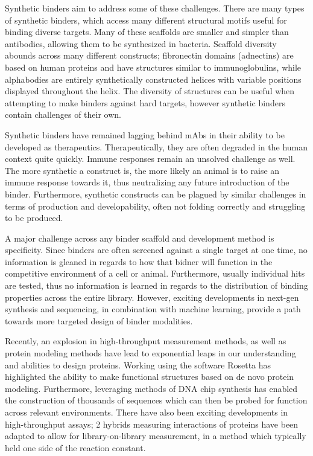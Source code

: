 Synthetic binders aim to address some of these challenges. There are many types of synthetic binders\cite{Yu2017-qj,Murali2012-tq,Krehenbrink2008-aj,Behar2013-ya,Desmet2014-ir,Richter2014-ll,Parmeggiani2008-tf,Boersma2011-kc,Schlatter2012-ay,Duan2007-hs,Binz2005-st,Nygren2008-tj,Vazquez-Lombardi2015-se}, which access many different structural motifs useful for binding diverse targets. Many of these scaffolds are smaller and simpler than antibodies, allowing them to be synthesized in bacteria. Scaffold diversity abounds across many different constructs; fibronectin domains (adnectins) are based on human proteins and have structures similar to immunoglobulins\cite{Dineen2008-im}, while alphabodies are entirely synthetically constructed helices with variable positions displayed throughout the helix\cite{Desmet2014-ir}. The diversity of structures can be useful when attempting to make binders against hard targets, however synthetic binders contain challenges of their own. 

Synthetic binders have remained lagging behind mAbs in their ability to be developed as therapeutics. Therapeutically, they are often degraded in the human context quite quickly. Immune responses remain an unsolved challenge as well. The more synthetic a construct is, the more likely an animal is to raise an immune response towards it, thus neutralizing any future introduction of the binder. Furthermore, synthetic constructs can be plagued by similar challenges in terms of production and developability, often not folding correctly and struggling to be produced. 

A major challenge across any binder scaffold and development method is specificity\cite{Schonbrunn2014-nb,Parseghian2013-rq,Rhodes2006-za,Herrera2013-wm,Mechetner2011-cm,Perkel2014-df,Weller2016-xv}. Since binders are often screened against a single target at one time, no information is gleaned in regards to how that bidner will function in the competitive environment of a cell or animal. Furthermore, usually individual hits are tested, thus no information is learned in regards to the distribution of binding properties across the entire library. However, exciting developments in next-gen synthesis and sequencing, in combination with machine learning, provide a path towards more targeted design of binder modalities. 

 Recently, an explosion in high-throughput measurement methods, as well as protein modeling methods have lead to exponential leaps in our understanding and abilities to design proteins. Working using the software Rosetta\cite{Chevalier2017-zf} has highlighted the ability to make functional structures based on de novo protein modeling.  Furthermore, leveraging methods of DNA chip synthesis has enabled the construction of thousands of sequences which can then be probed for function across relevant environments\cite{Melnikov2012-oc,Starita2015-uk}. There have also been exciting developments in high-throughput assays; 2 hybrids measuring interactions of proteins have been adapted to allow for library-on-library measurement, in a method which typically held one side of the reaction constant\cite{Yachie2016-ss,Trigg2017-hz,Younger2017-as}. 


